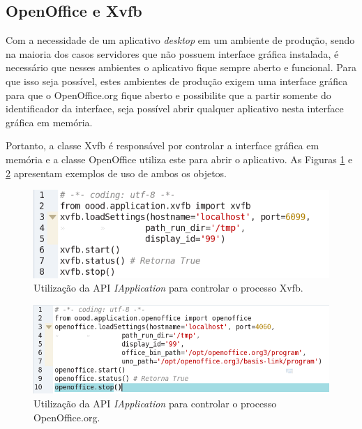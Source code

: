\subsection{OpenOffice e Xvfb}
\label{obj:openoffice}

Com a necessidade de um aplicativo \textit{desktop} em um ambiente de produção, sendo na maioria dos casos servidores que não possuem interface gráfica instalada, é necessário que nesses ambientes o aplicativo fique sempre aberto e funcional. Para que isso seja possível, estes ambientes  de produção exigem uma interface gráfica para que o OpenOffice.org fique aberto e possibilite que a partir somente do identificador da interface, seja possível abrir qualquer aplicativo nesta interface gráfica em memória.

Portanto, a classe Xvfb é responsável por controlar a interface gráfica em memória e a classe OpenOffice utiliza este para abrir o aplicativo. As Figuras \ref{exemplo:xvfb} e \ref{exemplo:openoffice} apresentam exemplos de uso de ambos os objetos.

\begin{figure}[ht]
\centering
\begin{center}
\includegraphics[scale=0.65,bb=0 0 550 156]{xvfb_exemplo.png}
\end{center}
\caption{Utilização da API \textit{IApplication} para controlar o processo Xvfb.}
\label{exemplo:xvfb}
\end{figure}

\begin{figure}[ht]
\centering
\begin{center}
\includegraphics[scale=0.65,bb=0 0 550 156]{openoffice_exemplo.png}
\end{center}
\caption{Utilização da API \textit{IApplication} para controlar o processo OpenOffice.org.}
\label{exemplo:openoffice}
\end{figure}

